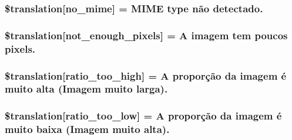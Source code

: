 \subsubsection[{\$translation}]{\setlength{\rightskip}{0pt plus 5cm}\$translation\mbox{[}\textquotesingle{}no\+\_\+mime\textquotesingle{}\mbox{]} = \textquotesingle{}M\+I\+M\+E type não detectado.\textquotesingle{}}\label{class_8upload_8pt___b_r_8php_a191a55df8e3bb7f3c51b70f3c1932e02}
\hypertarget{class_8upload_8pt___b_r_8php_a1fe342c27ce61f4ff4e0120ba647033e}{}
\subsubsection[{\$translation}]{\setlength{\rightskip}{0pt plus 5cm}\$translation\mbox{[}\textquotesingle{}not\+\_\+enough\+\_\+pixels\textquotesingle{}\mbox{]} = \textquotesingle{}A imagem tem poucos pixels.\textquotesingle{}}\label{class_8upload_8pt___b_r_8php_a1fe342c27ce61f4ff4e0120ba647033e}
\hypertarget{class_8upload_8pt___b_r_8php_a23396f6ce7f31e5e5f1b57580621d982}{}
\subsubsection[{\$translation}]{\setlength{\rightskip}{0pt plus 5cm}\$translation\mbox{[}\textquotesingle{}ratio\+\_\+too\+\_\+high\textquotesingle{}\mbox{]} = \textquotesingle{}A proporção da imagem é muito alta (Imagem muito larga).\textquotesingle{}}\label{class_8upload_8pt___b_r_8php_a23396f6ce7f31e5e5f1b57580621d982}
\hypertarget{class_8upload_8pt___b_r_8php_ac533b9a479f056b0b8623e4268f068c2}{}
\subsubsection[{\$translation}]{\setlength{\rightskip}{0pt plus 5cm}\$translation\mbox{[}\textquotesingle{}ratio\+\_\+too\+\_\+low\textquotesingle{}\mbox{]} = \textquotesingle{}A proporção da imagem é muito baixa (Imagem muito alta).\textquotesingle{}}\label{class_8upload_8pt___b_r_8php_ac533b9a479f056b0b8623e4268f068c2}
\hypertarget{class_8upload_8pt___b_r_8php_a01bea14c9fd5f353f62db44beabfcd42}{}
